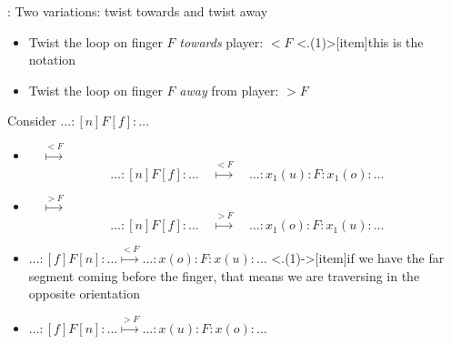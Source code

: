 
\begin{frame}{\secname: \subsecname}
 Two variations: twist towards and twist away
\begin{itemize}
    \item Twist the loop on finger $F$ \emph{towards} player: $<F$
    \note<.(1)>[item]{this is the notation}
    \item Twist the loop on finger $F$ \emph{away} from player: $>F$
\end{itemize}
 Consider $\ldots:[n]F[f]:\ldots$
\begin{itemize}
    \item{} $\quad\stackrel{<F}\mapsto\quad$ 
    $$
    \ldots:[n]F[f]:\ldots\quad\stackrel{<F}\mapsto\quad\ldots:x_1(u):F:x_1(o):\ldots
    $$
    \item {} $\quad\stackrel{>F}\mapsto\quad$ 
    $$
    \ldots:[n]F[f]:\ldots\quad\stackrel{>F}\mapsto\quad\ldots:x_1(o):F:x_1(u):\ldots
    $$
    \item $\ldots:[f]F[n]:\ldots\stackrel{<F}\mapsto \ldots:x(o):F:x(u):\ldots$
\note<.(1)->[item]{if we have the far segment coming before the finger, that means we are traversing in the opposite orientation}
    \item $\ldots:[f]F[n]:\ldots\stackrel{>F}\mapsto \ldots:x(u):F:x(o):\ldots$
\end{itemize}

\end{frame}
